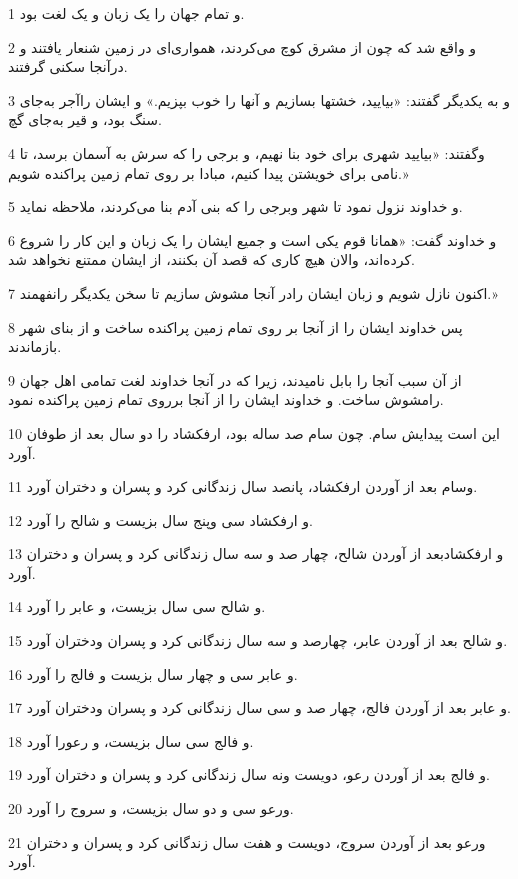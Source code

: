\par 1 و تمام جهان را یک زبان و یک لغت بود.
\par 2 و واقع شد که چون از مشرق کوچ می‌کردند، همواری‌ای در زمین شنعار یافتند و درآنجا سکنی گرفتند.
\par 3 و به یکدیگر گفتند: «بیایید، خشتها بسازیم و آنها را خوب بپزیم.» و ایشان راآجر به‌جای سنگ بود، و قیر به‌جای گچ.
\par 4 وگفتند: «بیایید شهری برای خود بنا نهیم، و برجی را که سرش به آسمان برسد، تا نامی برای خویشتن پیدا کنیم، مبادا بر روی تمام زمین پراکنده شویم.»
\par 5 و خداوند نزول نمود تا شهر وبرجی را که بنی آدم بنا می‌کردند، ملاحظه نماید.
\par 6 و خداوند گفت: «همانا قوم یکی است و جمیع ایشان را یک زبان و این کار را شروع کرده‌اند، والان هیچ کاری که قصد آن بکنند، از ایشان ممتنع نخواهد شد.
\par 7 اکنون نازل شویم و زبان ایشان رادر آنجا مشوش سازیم تا سخن یکدیگر رانفهمند.»
\par 8 پس خداوند ایشان را از آنجا بر روی تمام زمین پراکنده ساخت و از بنای شهر بازماندند.
\par 9 از آن سبب آنجا را بابل نامیدند، زیرا که در آنجا خداوند لغت تمامی اهل جهان رامشوش ساخت. و خداوند ایشان را از آنجا برروی تمام زمین پراکنده نمود.
\par 10 این است پیدایش سام. چون سام صد ساله بود، ارفکشاد را دو سال بعد از طوفان آورد.
\par 11 وسام بعد از آوردن ارفکشاد، پانصد سال زندگانی کرد و پسران و دختران آورد.
\par 12 و ارفکشاد سی وپنج سال بزیست و شالح را آورد.
\par 13 و ارفکشادبعد از آوردن شالح، چهار صد و سه سال زندگانی کرد و پسران و دختران آورد.
\par 14 و شالح سی سال بزیست، و عابر را آورد.
\par 15 و شالح بعد از آوردن عابر، چهارصد و سه سال زندگانی کرد و پسران ودختران آورد.
\par 16 و عابر سی و چهار سال بزیست و فالج را آورد.
\par 17 و عابر بعد از آوردن فالج، چهار صد و سی سال زندگانی کرد و پسران ودختران آورد.
\par 18 و فالج سی سال بزیست، و رعورا آورد.
\par 19 و فالج بعد از آوردن رعو، دویست ونه سال زندگانی کرد و پسران و دختران آورد.
\par 20 ورعو سی و دو سال بزیست، و سروج را آورد.
\par 21 ورعو بعد از آوردن سروج، دویست و هفت سال زندگانی کرد و پسران و دختران آورد.
